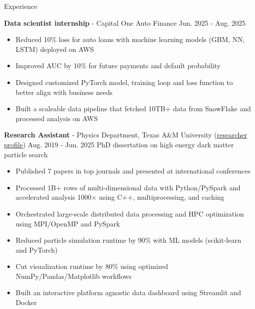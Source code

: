 \documentclass{resume}
\begin{document}
\begin{rSection}{Experience}
    \vspace{-1em}
    \item \textbf{Data scientist internship} - Capital One Auto Finance \hfill Jun. 2025 - Aug. 2025
        \begin{itemize}
        \item Reduced 10\% loss for auto loans with machine learning models (GBM, NN, LSTM) deployed on AWS
        \item Improved AUC by 10\% for future payments and default probability
        \item Designed customized PyTorch model, training loop and loss function to better align with business needs
        \item Built a scaleable data pipeline that fetched 10TB+ data from SnowFlake and processed analysis on AWS
        \end{itemize}

    \item \textbf{Research Assistant} - Physics Department, Texas A\&M University (\href{https://inspirehep.net/authors/2661451}{researcher profile}) \hfill Aug. 2019 - Jun. 2025
        \newline\hspace*{0.5em} {\normalsize PhD dissertation on high energy dark matter particle search}
        \begin{itemize}
        \item Published 7 papers in top journals and presented at international conferences
        \item Processed 1B+ rows of multi-dimensional data with Python/PySpark and accelerated analysis 1000× using C++, multiprocessing, and caching
        \item Orchestrated large-scale distributed data processing and HPC optimization using MPI/OpenMP and PySpark
        \item Reduced particle simulation runtime by 90\% with ML models (scikit-learn and PyTorch)
        \item Cut visualization runtime by 80\% using optimized NumPy/Pandas/Matplotlib workflows
        \item Built an interactive platform agnostic data dashboard using Streamlit and Docker
        \end{itemize}


\end{rSection}
\end{document}
